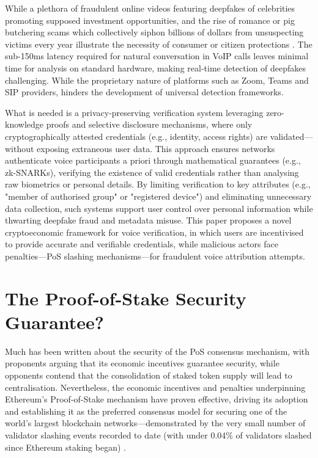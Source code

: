 \documentclass[11pt,a4paper]{article}
\begin{document}
While a plethora of fraudulent online videos featuring deepfakes of celebrities promoting supposed investment opportunities, and the rise of romance or \textquotesingle pig butchering\textquotesingle{} scams which collectively siphon billions of dollars from unsuspecting victims every year illustrate the necessity of consumer or citizen protections \cite{economist2024scaminc}.
The sub-150ms latency required for natural conversation in VoIP calls leaves minimal time for analysis on standard hardware, making real-time detection of deepfakes challenging. While the proprietary nature of platforms such as Zoom, Teams and SIP providers, hinders the development of universal detection frameworks.

What is needed is a privacy-preserving verification system leveraging zero-knowledge proofs and selective disclosure mechanisms, where only cryptographically attested credentials (e.g., identity, access rights) are validated—without exposing extraneous user data.
This approach ensures networks authenticate voice participants a priori through mathematical guarantees (e.g., zk-SNARKs), verifying the existence of valid credentials rather than analysing raw biometrics or personal details.
By limiting verification to key attributes (e.g., "member of authorised group" or "registered device") and eliminating unnecessary data collection, such systems support user control over personal information while thwarting deepfake fraud and metadata misuse.
This paper proposes a novel cryptoeconomic framework for voice verification, in which users are incentivised to provide accurate and verifiable credentials, while malicious actors face penalties—PoS slashing mechanisms—for fraudulent voice attribution attempts.

\section{The Proof-of-Stake Security Guarantee?}
\label{sec:background}
Much has been written about the security of the PoS consensus mechanism, with proponents arguing that its economic incentives guarantee security, while opponents contend that the consolidation of staked token supply will lead to centralisation.
Nevertheless, the economic incentives and penalties underpinning Ethereum's Proof-of-Stake mechanism have proven effective, driving its adoption and establishing it as the preferred consensus model for securing one of the world's largest blockchain networks—demonstrated by the very small number of validator slashing events recorded to date (with under 0.04\% of validators slashed since Ethereum staking began) \cite{consensys2024slashing}.
\end{document}
